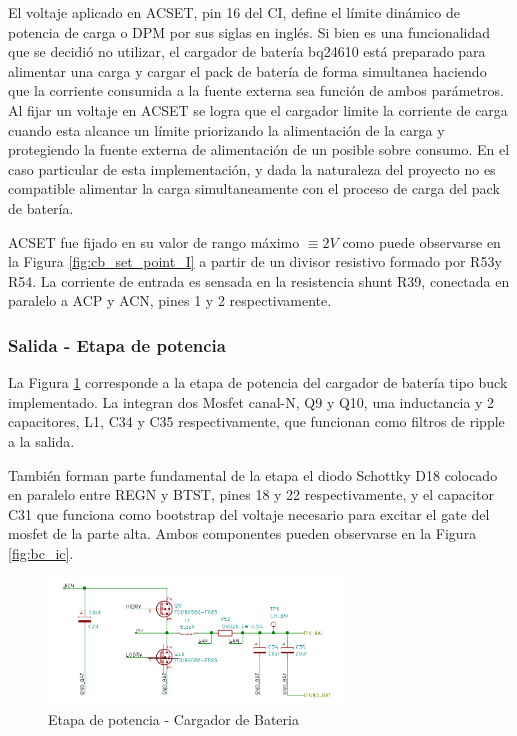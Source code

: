 \documentclass[10pt, a4paper]{report}
\begin{document}
El voltaje aplicado en ACSET, pin 16 del \acrshort{CI}, define el límite
dinámico de potencia de carga o \acrfull{DPM} por sus siglas en inglés. Si bien
es una funcionalidad que se decidi\'o no utilizar, el cargador de batería bq24610
está preparado para alimentar una carga y cargar el pack de batería de forma
simultanea haciendo que la corriente consumida a la fuente externa sea función
de ambos parámetros. Al fijar un voltaje en ACSET se logra que el cargador
limite la corriente de carga cuando esta alcance un límite priorizando la
alimentación de la carga y protegiendo la fuente externa de alimentación de un
posible sobre consumo. En el caso particular de esta implementación, y dada la
naturaleza del proyecto no es compatible alimentar la carga simultaneamente con
el proceso de carga del pack de batería.

ACSET fue fijado en su valor de rango máximo $\equiv 2V$ como puede observarse
en la Figura \ref{fig:cb_set_point_I} a partir de un divisor resistivo formado
por R53y R54. La corriente de entrada es sensada en la resistencia shunt R39,
conectada en paralelo a ACP y ACN, pines 1 y 2 respectivamente.

\subsubsection{Salida - Etapa de potencia}

La Figura \ref{fig:cb_output} corresponde a la etapa de potencia del cargador de
batería tipo buck implementado. La integran dos Mosfet canal-N, Q9 y Q10, una
inductancia y 2 capacitores, L1, C34 y C35 respectivamente, que funcionan como
filtros de ripple a la salida.

También forman parte fundamental de la etapa el diodo Schottky D18 colocado en
paralelo entre REGN y BTST, pines 18 y 22 respectivamente, y el capacitor C31
que funciona como bootstrap del voltaje necesario para excitar el gate del mosfet
de la parte alta. Ambos componentes pueden observarse en la Figura \ref{fig:bc_ic}.

\begin{figure}[h!]
    \centering
    \includegraphics[width=0.7\textwidth]{hardware/bat_charger/bc_output.png}
    \caption{Etapa de potencia - Cargador de Bateria}
    \label{fig:cb_output}
\end{figure}
\FloatBarrier
\end{document}

